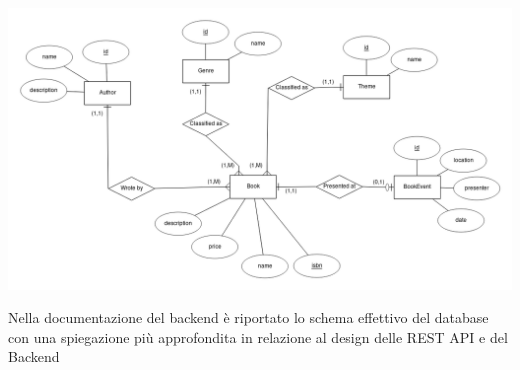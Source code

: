 \documentclass[12pt,a4paper,oneside]{report}
\begin{document}
\includegraphics[width=1\textwidth]{er}

Nella documentazione del backend è riportato lo schema effettivo del database con una spiegazione più approfondita in relazione al design delle REST API e del Backend
\end{document}
